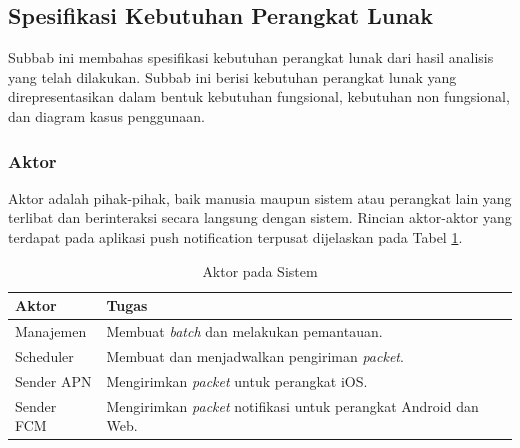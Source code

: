 \subsection{Spesifikasi Kebutuhan Perangkat Lunak}
\par Subbab ini membahas spesifikasi kebutuhan perangkat lunak dari hasil analisis yang telah dilakukan. Subbab ini berisi kebutuhan perangkat lunak yang direpresentasikan dalam bentuk kebutuhan fungsional, kebutuhan non fungsional, dan diagram kasus penggunaan.

\subsubsection{Aktor}
\par Aktor adalah pihak-pihak, baik manusia maupun sistem atau perangkat lain yang terlibat dan berinteraksi secara langsung dengan sistem. Rincian aktor-aktor yang terdapat pada aplikasi push notification terpusat dijelaskan pada Tabel \ref{t:aktor}.
\begin{longtable}{|p{2cm}|p{7cm}|}
    \caption{Aktor pada Sistem} \label{t:aktor} \\ \hline
    \rowcolor{lightgray} Aktor & Tugas \\ \hline
    Manajemen & Membuat \textit{batch} dan melakukan pemantauan. \\ \hline
    Scheduler & Membuat dan menjadwalkan pengiriman \textit{packet}. \\ \hline
    Sender APN & Mengirimkan \textit{packet} untuk perangkat iOS. \\ \hline
    Sender FCM & Mengirimkan \textit{packet} notifikasi untuk perangkat Android dan Web. \\ \hline
\end{longtable}

